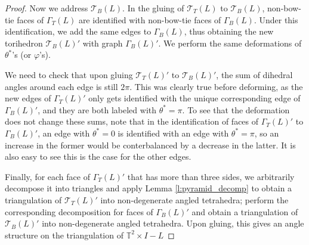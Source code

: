 \documentclass[11pt]{amsart}
\newcommand{\lemref}[1]{Lemma \ref{#1}}
\newcommand{\torus}{{\mathbb{T}^2}}
\newcommand{\sT}{{\mathcal{T}}}
\newcommand{\vphi}{\varphi}
\newcommand{\toruscomp}[1]{{\torus \times I - #1}}
\theoremstyle{plain}
\theoremstyle{definition}
\begin{document}
\begin{proof}
Now we address $\sT_B(L)$.
In the gluing of $\sT_T(L)$ to $\sT_B(L)$,
non-bow-tie faces of $\Gamma_T(L)$ are identified with
non-bow-tie faces of $\Gamma_B(L)$.
Under this identification, we add the same edges to $\Gamma_B(L)$,
thus obtaining the new torihedron $\sT_B(L)'$ with graph
$\Gamma_B(L)'$.
We perform the same deformations of $\theta^*$'s (or $\vphi$'s).


We need to check that upon gluing $\sT_T(L)'$ to $\sT_B(L)'$,
the sum of dihedral angles around each edge is still $2\pi$.
This was clearly true before deforming, as the new edges of
$\Gamma_T(L)'$ only gets identified with the unique
corresponding edge of $\Gamma_B(L)'$, and they are both labeled
with $\theta^* = \pi$.
To see that the deformation does not change these sums,
note that in the identification of faces of $\Gamma_T(L)'$
to $\Gamma_B(L)'$,
an edge with $\theta^*=0$ is identified with an edge with
$\theta^*=\pi$,
so an increase in the former would be conterbalanced by
a decrease in the latter.
It is also easy to see this is the case for the other edges.


Finally, for each face of $\Gamma_T(L)'$ that has more than three sides,
we arbitrarily decompose it into triangles
and apply \lemref{l:pyramid_decomp}
to obtain a triangulation of $\sT_T(L)'$ into non-degenerate angled tetrahedra;
perform the corresponding decomposition for faces of
$\Gamma_B(L)'$ and obtain a triangulation of $\sT_B(L)'$
into non-degenerate angled tetrahedra.
Upon gluing, this gives an angle structure on the triangulation
of $\toruscomp{L}$
\end{proof}








\end{document}
